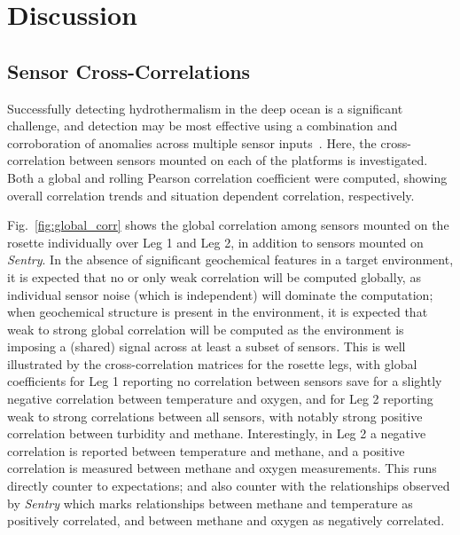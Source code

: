 \section{Discussion}

\subsection{Sensor Cross-Correlations}
\label{sec:correl}
Successfully detecting hydrothermalism in the deep ocean is a significant challenge, and detection may be most effective using a combination and corroboration of anomalies across multiple sensor inputs~\autocite{jakuba2007stochastic}. Here, the cross-correlation between sensors mounted on each of the platforms is investigated. Both a global and rolling Pearson correlation coefficient were computed, showing overall correlation trends and situation dependent correlation, respectively.

Fig.~\ref{fig:global_corr} shows the global correlation among sensors mounted on the rosette individually over Leg 1 and Leg 2, in addition to sensors mounted on \emph{Sentry}. In the absence of significant geochemical features in a target environment, it is expected that no or only weak correlation will be computed globally, as individual sensor noise (which is independent) will dominate the computation; when geochemical structure is present in the environment, it is expected that weak to strong global correlation will be computed as the environment is imposing a (shared) signal across at least a subset of sensors. This is well illustrated by the cross-correlation matrices for the rosette legs, with global coefficients for Leg 1 reporting no correlation between sensors save for a slightly negative correlation between temperature and oxygen, and for Leg 2 reporting weak to strong correlations between all sensors, with notably strong positive correlation between turbidity and methane. Interestingly, in Leg 2 a negative correlation is reported between temperature and methane, and a positive correlation is measured between methane and oxygen measurements. This runs directly counter to expectations; and also counter with the relationships observed by \emph{Sentry} which marks relationships between methane and temperature as positively correlated, and between methane and oxygen as negatively correlated. 

